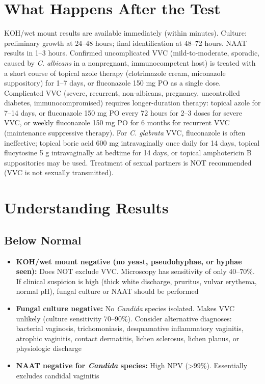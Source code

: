 \section*{What Happens After the Test}
KOH/wet mount results are available immediately (within minutes). Culture: preliminary growth at 24--48 hours; final identification at 48--72 hours. NAAT results in 1--3 hours. Confirmed uncomplicated VVC (mild-to-moderate, sporadic, caused by \textit{C. albicans} in a nonpregnant, immunocompetent host) is treated with a short course of topical azole therapy (clotrimazole cream, miconazole suppository) for 1--7 days, or fluconazole 150 mg PO as a single dose. Complicated VVC (severe, recurrent, non-albicans, pregnancy, uncontrolled diabetes, immunocompromised) requires longer-duration therapy: topical azole for 7--14 days, or fluconazole 150 mg PO every 72 hours for 2--3 doses for severe VVC, or weekly fluconazole 150 mg PO for 6 months for recurrent VVC (maintenance suppressive therapy). For \textit{C. glabrata} VVC, fluconazole is often ineffective; topical boric acid 600 mg intravaginally once daily for 14 days, topical flucytosine 5 g intravaginally at bedtime for 14 days, or topical amphotericin B suppositories may be used. Treatment of sexual partners is NOT recommended (VVC is not sexually transmitted).

\section*{Understanding Results}

\subsection*{Below Normal}
\begin{itemize}
  \item \textbf{KOH/wet mount negative (no yeast, pseudohyphae, or hyphae seen):} Does NOT exclude VVC. Microscopy has sensitivity of only 40--70\%. If clinical suspicion is high (thick white discharge, pruritus, vulvar erythema, normal pH), fungal culture or NAAT should be performed
  \item \textbf{Fungal culture negative:} No \textit{Candida} species isolated. Makes VVC unlikely (culture sensitivity 70--90\%). Consider alternative diagnoses: bacterial vaginosis, trichomoniasis, desquamative inflammatory vaginitis, atrophic vaginitis, contact dermatitis, lichen sclerosus, lichen planus, or physiologic discharge
  \item \textbf{NAAT negative for \textit{Candida} species:} High NPV (>99\%). Essentially excludes candidal vaginitis
\end{itemize}

